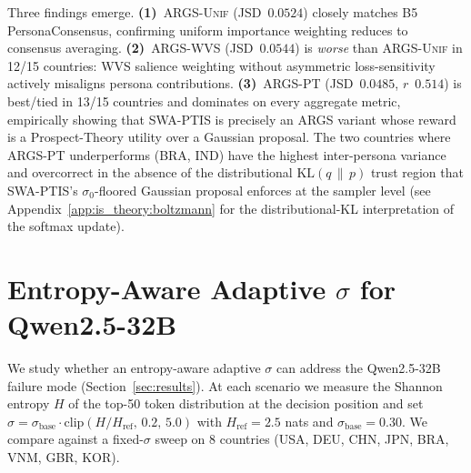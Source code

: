 \documentclass{article}
\begin{document}
Three findings emerge. \textbf{(1)}~\textsc{ARGS-Unif} (JSD~$0.0524$) closely
matches B5 PersonaConsensus, confirming uniform importance weighting reduces to
consensus averaging. \textbf{(2)}~\textsc{ARGS-WVS} (JSD~$0.0544$) is
\emph{worse} than \textsc{ARGS-Unif} in 12/15 countries: WVS salience weighting
without asymmetric loss-sensitivity actively misaligns persona contributions.
\textbf{(3)}~\textsc{ARGS-PT} (JSD~$0.0485$, $r$~$0.514$) is best/tied in 13/15
countries and dominates on every aggregate metric, empirically showing that
SWA-PTIS is precisely an ARGS variant whose reward is a Prospect-Theory
utility over a Gaussian proposal. The two countries where \textsc{ARGS-PT}
underperforms (BRA, IND) have the highest inter-persona variance and
overcorrect in the absence of the distributional
$\mathrm{KL}(q\,\|\,p)$ trust region that SWA-PTIS's $\sigma_0$-floored
Gaussian proposal enforces at the sampler level (see
Appendix~\ref{app:is_theory:boltzmann} for the distributional-KL
interpretation of the softmax update).

\section{Entropy-Aware Adaptive $\sigma$ for Qwen2.5-32B}
\label{app:adaptive_sigma}

We study whether an entropy-aware adaptive $\sigma$ can address the Qwen2.5-32B
failure mode (Section~\ref{sec:results}). At each scenario we measure the Shannon
entropy $H$ of the top-50 token distribution at the decision position and set
$\sigma=\sigma_\text{base}\cdot\text{clip}(H/H_\text{ref},\,0.2,\,5.0)$ with
$H_\text{ref}{=}2.5$ nats and $\sigma_\text{base}{=}0.30$. We compare against a
fixed-$\sigma$ sweep on 8 countries (USA, DEU, CHN, JPN, BRA, VNM, GBR, KOR).
\end{document}
